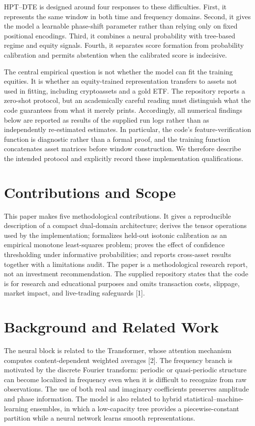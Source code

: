 \documentclass[11pt]{article}
\begin{document}
HPT--DTE is designed around four responses to these difficulties. First, it represents the same window in both time and frequency domains. Second, it gives the model a learnable phase-shift parameter rather than relying only on fixed positional encodings. Third, it combines a neural probability with tree-based regime and equity signals. Fourth, it separates score formation from probability calibration and permits abstention when the calibrated score is indecisive.

The central empirical question is not whether the model can fit the training equities. It is whether an equity-trained representation transfers to assets not used in fitting, including cryptoassets and a gold ETF. The repository reports a zero-shot protocol, but an academically careful reading must distinguish what the code guarantees from what it merely prints. Accordingly, all numerical findings below are reported as results of the supplied run logs rather than as independently re-estimated estimates. In particular, the code's feature-verification function is diagnostic rather than a formal proof, and the training function concatenates asset matrices before window construction. We therefore describe the intended protocol and explicitly record these implementation qualifications.

\section{Contributions and Scope}
This paper makes five methodological contributions. It gives a reproducible description of a compact dual-domain architecture; derives the tensor operations used by the implementation; formalizes held-out isotonic calibration as an empirical monotone least-squares problem; proves the effect of confidence thresholding under informative probabilities; and reports cross-asset results together with a limitations audit. The paper is a methodological research report, not an investment recommendation. The supplied repository states that the code is for research and educational purposes and omits transaction costs, slippage, market impact, and live-trading safeguards [1].

\section{Background and Related Work}
The neural block is related to the Transformer, whose attention mechanism computes content-dependent weighted averages [2]. The frequency branch is motivated by the discrete Fourier transform: periodic or quasi-periodic structure can become localized in frequency even when it is difficult to recognize from raw observations. The use of both real and imaginary coefficients preserves amplitude and phase information. The model is also related to hybrid statistical--machine-learning ensembles, in which a low-capacity tree provides a piecewise-constant partition while a neural network learns smooth representations.
\end{document}

